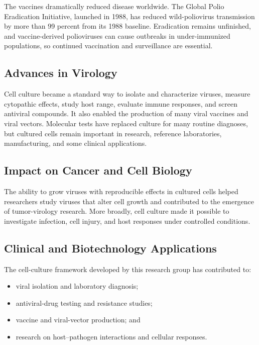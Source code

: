 The vaccines dramatically reduced disease worldwide. The Global Polio Eradication Initiative, launched in 1988, has reduced wild-poliovirus transmission by more than 99 percent from its 1988 baseline. Eradication remains unfinished, and vaccine-derived polioviruses can cause outbreaks in under-immunized populations, so continued vaccination and surveillance are essential.

\subsection{Advances in Virology}

Cell culture became a standard way to isolate and characterize viruses, measure cytopathic effects, study host range, evaluate immune responses, and screen antiviral compounds. It also enabled the production of many viral vaccines and viral vectors. Molecular tests have replaced culture for many routine diagnoses, but cultured cells remain important in research, reference laboratories, manufacturing, and some clinical applications.

\subsection{Impact on Cancer and Cell Biology}

The ability to grow viruses with reproducible effects in cultured cells helped researchers study viruses that alter cell growth and contributed to the emergence of tumor-virology research. More broadly, cell culture made it possible to investigate infection, cell injury, and host responses under controlled conditions.

\subsection{Clinical and Biotechnology Applications}

The cell-culture framework developed by this research group has contributed to:

\begin{itemize}
\item viral isolation and laboratory diagnosis;
\item antiviral-drug testing and resistance studies;
\item vaccine and viral-vector production; and
\item research on host--pathogen interactions and cellular responses.
\end{itemize}

